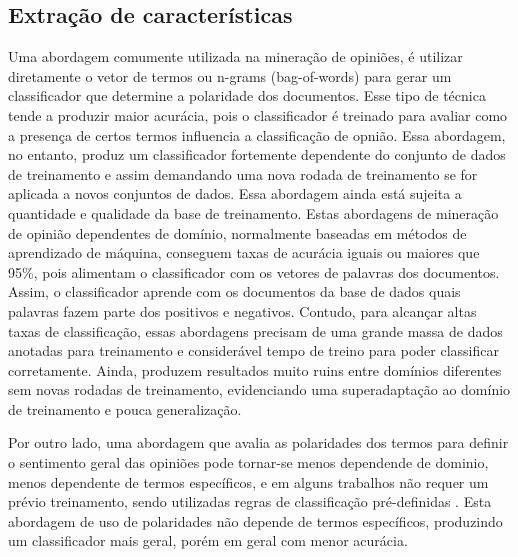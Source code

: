 \documentclass[template.tex]{subfiles}
\begin{document}
\subsection{Extração de características}

Uma abordagem comumente utilizada na mineração de opiniões, é utilizar diretamente o vetor de termos ou n-grams (bag-of-words) para gerar um classificador que determine a polaridade dos documentos. Esse tipo de técnica tende a produzir maior acurácia, pois o classificador é treinado para avaliar como a presença de certos termos influencia a classificação de opnião. Essa abordagem, no entanto, produz um classificador fortemente dependente do conjunto de dados de treinamento e assim demandando uma nova rodada de treinamento se for aplicada a novos conjuntos de dados. Essa abordagem ainda está sujeita a quantidade e qualidade da base de treinamento. Estas abordagens de mineração de opinião dependentes de domínio, normalmente baseadas em métodos de aprendizado de máquina, conseguem taxas de acurácia iguais ou maiores que 95\%, pois alimentam o classificador com os vetores de palavras dos documentos. Assim, o classificador aprende com os documentos da base de dados quais palavras fazem parte dos positivos e negativos. Contudo, para alcançar altas taxas de classificação, essas abordagens precisam de uma grande massa de dados anotadas para treinamento e considerável tempo de treino para poder classificar corretamente. Ainda, produzem resultados muito ruins entre domínios diferentes sem novas rodadas de treinamento, evidenciando uma superadaptação ao domínio de treinamento e pouca generalização.


Por outro lado, uma abordagem que avalia as polaridades dos termos para definir o sentimento geral das opiniões pode tornar-se menos dependende de dominio, menos dependente de termos específicos,  e em alguns trabalhos não requer um prévio treinamento, sendo utilizadas regras de classificação pré-definidas \cite{nadali2010sentiment, pimpalkar2013sentimental}. Esta abordagem de uso de polaridades não depende de termos específicos, produzindo um classificador mais geral, porém em geral com menor acurácia. 

\end{document}

